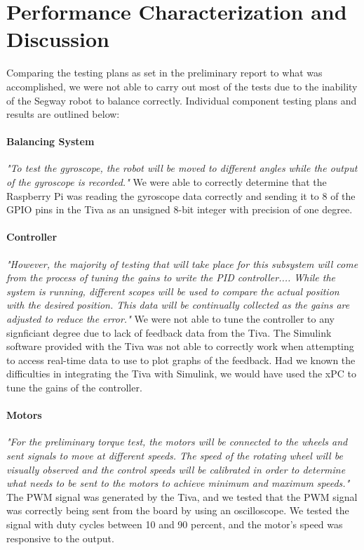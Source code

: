 \documentclass[11pt]{report}
\begin{document}
\begin{spacing}{1.5}
\begin{itemize}
\end{itemize}

\section*{Performance Characterization and Discussion}

    Comparing the testing plans as set in the preliminary report to what was accomplished, we were not able to carry out most of the tests due to the inability of the Segway robot to balance correctly. Individual component testing plans and results are outlined below:
    
        \paragraph{Balancing System} \emph{"To test the gyroscope, the robot will be moved to different angles while the output of the gyroscope is recorded."} We were able to correctly determine that the Raspberry Pi was reading the gyroscope data correctly and sending it to 8 of the GPIO pins in the Tiva as an unsigned 8-bit integer with precision of one degree.
        
        \paragraph{Controller} \emph{"However, the majority of testing that will take place for this subsystem will come from the process of tuning the gains to write the PID controller.... While the system is running, different scopes will be used to compare the actual position with the desired position.  This data will be continually collected as the gains are adjusted to reduce the error."} We were not able to tune the controller to any signficiant degree due to lack of feedback data from the Tiva. The Simulink software provided with the Tiva was not able to correctly work when attempting to access real-time data to use to plot graphs of the feedback. Had we known the difficulties in integrating the Tiva with Simulink, we would have used the xPC to tune the gains of the controller.
        
        \paragraph{Motors} \emph{"For the preliminary torque test, the motors will be connected to the wheels and sent signals to move at different speeds. The speed of the rotating wheel will be visually observed and the control speeds will be calibrated in order to determine what needs to be sent to the motors to achieve minimum and maximum speeds."} The PWM signal was generated by the Tiva, and we tested that the PWM signal was correctly being sent from the board by using an oscilloscope. We tested the signal with duty cycles between 10 and 90 percent, and the motor's speed was responsive to the output.
        

\end{spacing}
\end{document}
